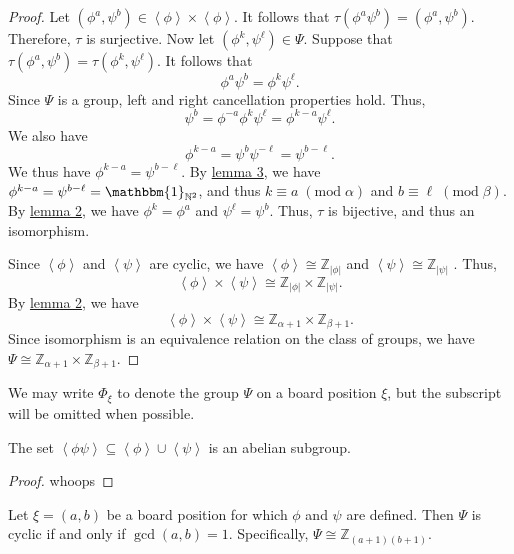\documentclass[11pt, letterpaper]{article}
\renewcommand{\mod}[1]{\;(\text{mod}\;#1)}
\begin{document}
\begin{proof}
	Let $\left( \phi ^a,\psi ^b \right) \in \left<\phi  \right>\times \left<\phi  \right>$. It follows that $\tau \left( \phi ^a\psi ^b \right) =\left( \phi^a,\psi ^b \right) $. Therefore, $ \tau $ is surjective. Now let $\left( \phi ^k,\psi  ^\ell  \right) \in\Psi $. Suppose that $\tau \left( \phi ^a,\psi ^b \right) =\tau \left( \phi ^k,\psi ^\ell  \right) $. It follows that
	\[
		\phi ^a\psi ^b=\phi ^k\psi ^\ell 
	.\]
	Since $\Psi $ is a group, left and right cancellation properties hold. Thus,
	\[
		\psi ^b=\phi ^{-a}\phi ^k\psi ^\ell=\phi ^{k-a}\psi ^{\ell }
	.\]
	We also have
	\[
		\phi ^{k-a}=\psi ^b\psi ^{-\ell }=\psi ^{b-\ell }
	.\]
	We thus have $\phi ^{k-a}=\psi ^{b-\ell }$. By \hyperref[lma:3]{lemma 3},  we have $\phi ^{k-a}=\psi ^{b-\ell }=\mathbbm{1}_{\mathbb{N}^2}$, and thus $k\equiv a\mod{\alpha }$ and $b\equiv \ell\mod{\beta } $. By \hyperref[lma:2]{lemma 2}, we have $\phi ^{k}=\phi ^a$ and $\psi ^\ell =\psi ^b$. Thus, $\tau $ is bijective, and thus an isomorphism.

	Since $\left<\phi  \right>$ and $\left<\psi  \right>$ are cyclic, we have $\left<\phi  \right>\cong \mathbb{Z}_{\left| \phi  \right| }$ and $\left<\psi  \right>\cong \mathbb{Z}_{\left| \psi  \right| }$ \cite{gallian, judson}. Thus,
	\[
		\left<\phi  \right>\times \left<\psi  \right>\cong \mathbb{Z}_{\left| \phi  \right| }\times \mathbb{Z}_{\left| \psi  \right| }
	.\]
	By \hyperref[lma:2]{lemma 2}, we have
	\[
		\left<\phi  \right>\times \left<\psi  \right>\cong \mathbb{Z}_{\alpha +1}\times \mathbb{Z}_{\beta+1 }
	.\]
	Since isomorphism is an equivalence relation on the class of groups, we have $\Psi \cong \mathbb{Z}_{\alpha+1 }\times \mathbb{Z}_{\beta+1 }$.
\end{proof}
\begin{remark}
	We may write $\Phi _\xi $ to denote the group $\Psi $ on a board position $\xi $, but the subscript will be omitted when possible.
\end{remark}
\begin{corollary}\label{cor:1}
	The set $\left<\phi \psi  \right>\subseteq \left<\phi  \right>\cup \left<\psi  \right> $ is an abelian subgroup.
\end{corollary}
\begin{proof}
	whoops
\end{proof}
\begin{corollary}\label{cor:2}
	Let $\xi =(a,b)$ be a board position for which $\phi $ and $\psi $ are defined. Then $\Psi $ is cyclic if and only if $\operatorname{gcd}(a,b) =1$. Specifically, $\Psi \cong \mathbb{Z}_{(a+1)(b+1)}$.
\end{corollary}
\end{document}
